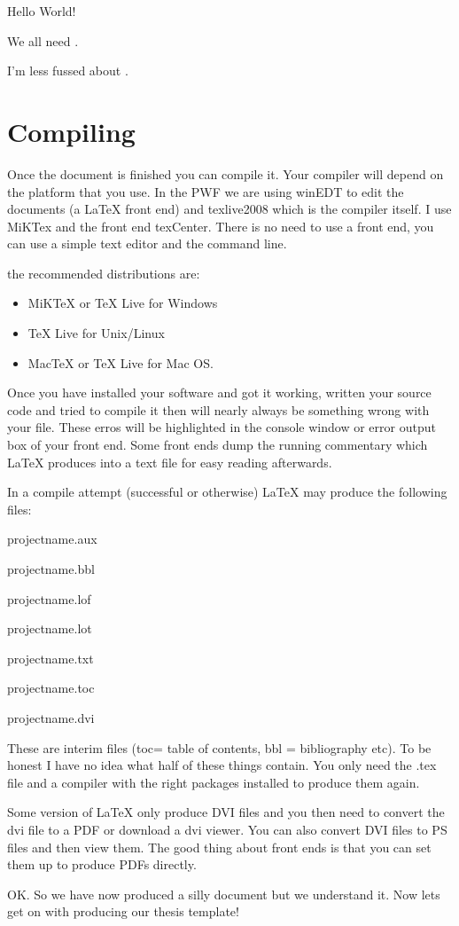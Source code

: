 \vspace{4ex}
Hello World!

We all need .

I'm less fussed about .

\pagebreak
\section{Compiling}
Once the document is finished you can compile it. Your compiler will depend on the platform that you use. In the PWF we are using winEDT to edit the documents (a LaTeX front end) and texlive2008 which is the compiler itself. I use MiKTex and the front end texCenter.  There is no need to use a front end, you can use a simple text editor and the command line.

the recommended distributions are:
\begin{itemize}
\item MiKTeX or TeX Live for Windows
\item TeX Live for Unix/Linux
\item MacTeX or TeX Live for Mac OS.
\end{itemize}

Once you have installed your software and got it working, written your source code and tried to compile it then will nearly always be something wrong with your file.  These erros will be highlighted in the console window or error output box of your front end.  Some front ends dump the running commentary which LaTeX produces into a text file for easy reading afterwards.

In a compile attempt (successful or otherwise) LaTeX may produce the following files:

projectname.aux

projectname.bbl

projectname.lof

projectname.lot

projectname.txt

projectname.toc

projectname.dvi

These are interim files (toc= table of contents, bbl = bibliography etc). To be honest I have no idea what half of these things contain.  You only need the .tex file and a compiler with the right packages installed to produce them again.

Some version of LaTeX only produce DVI files and you then need to convert the dvi file to a PDF or download a dvi viewer. You can also convert DVI files to PS files and then view them.  The good thing about front ends is that you can set them up to produce PDFs directly.

OK. So we have now produced a silly document but we understand it.  Now lets get on with producing our thesis template!


